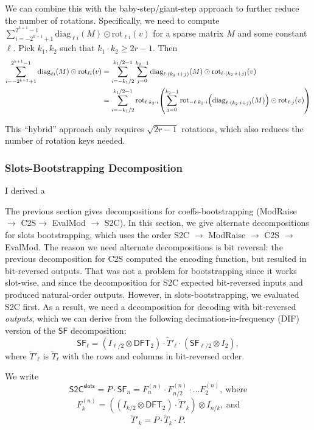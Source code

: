 \documentclass[../fheimpl.tex]{subfiles}
\begin{document}
	We can combine this with the baby-step/giant-step approach to further reduce the number of rotations.
	Specifically, we need to compute $\sum_{i=-2^{k+1}+1}^{2^{k+1}-1} \mathrm{diag}_{\ell i}(M)\odot \mathrm{rot}_{\ell i}(v)$ for a sparse matrix $M$ and some constant $\ell$. Pick $k_1, k_2$ such that $k_1\cdot k_2\ge 2r-1$. Then
	\begin{align}
	\sum_{i=-2^{k+1}+1}^{2^{k+1}-1} \mathrm{diag}_{\ell i}(M)\odot \mathrm{rot}_{\ell i}(v) &= \sum_{i=-k_1/2}^{k_1/2-1}\sum_{j=0}^{k_2-1} \mathrm{diag}_{\ell \cdot (k_2\cdot i+j)}(M)\odot \mathrm{rot}_{\ell \cdot (k_2\cdot i+j)}(v) \\
	&= \sum_{i=-k_1/2}^{k_1/2-1}\mathrm{rot}_{\ell\cdot k_2\cdot i}\parens*{\sum_{j=0}^{k_2-1} \mathrm{rot}_{-\ell\cdot k_2\cdot i}\parens*{\mathrm{diag}_{\ell \cdot (k_2\cdot i+j)}(M)}\odot \mathrm{rot}_{\ell \cdot j}(v)}
	\end{align}
	
	This ``hybrid'' approach only requires $\sqrt{2r-1}$ rotations, which also reduces the number of rotation keys needed.
	
	\subsubsection{Slots-Bootstrapping Decomposition}
	I derived a 
	
	The previous section gives decompositions for coeffs-bootstrapping (ModRaise $\rightarrow$ C2S$ \rightarrow$ EvalMod $\rightarrow$ S2C). In this section, we give alternate decompositions for slots bootstrapping, which uses the order S2C $\rightarrow$ ModRaise $\rightarrow$ C2S $\rightarrow$ EvalMod. The reason we need alternate decompositions is bit reversal: the previous decomposition for C2S computed the encoding function, but resulted in bit-reversed outputs. That was not a problem for bootstrapping since it works slot-wise, and since the decomposition for S2C expected bit-reversed inputs and produced natural-order outputs. However, in slots-bootstrapping, we evaluated S2C first. As a result, we need a decomposition for decoding with bit-reversed \emph{outputs}, which we can derive from the following decimation-in-frequency (DIF) version of the $\mathsf{SF}$ decomposition:
	\[\mathsf{SF}_\ell = (I_{\ell/2} \otimes \mathsf{DFT}_2)\cdot \tilde{T}'_\ell\cdot(\mathsf{SF}_{\ell/2}\otimes I_2),\]
	where $\tilde{T}'_\ell$ is $\tilde{T}_\ell$  with the rows and columns in bit-reversed order.
	
	We write 
	\[\mathsf{S2C}^\mathsf{slots}=P\cdot \mathsf{SF}_n = F_n^{(n)}\cdot F_{n/2}^{(n)}\cdot\ldots F_2^{(n)},\ \text{where}\]
	\[F_k^{(n)} = ((I_{k/2}\otimes \mathsf{DFT}_2)\cdot\tilde{T}'_k) \otimes I_{n/k},\ \text{and}\]
	\[\tilde{T}'_k = P\cdot \tilde{T}_k\cdot P.
	\]
	
\end{document}
